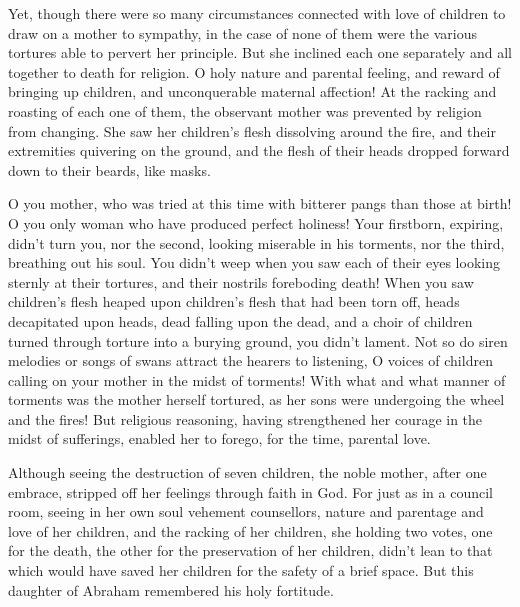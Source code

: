  Yet, though there were so many circumstances connected
with love of children to draw on a mother to sympathy, in the case of
none of them were the various tortures able to pervert her principle.
 But she inclined each one separately and all together to
death for religion.  O holy nature and parental feeling,
and reward of bringing up children, and unconquerable maternal
affection!  At the racking and roasting of each one of
them, the observant mother was prevented by religion from changing.
 She saw her children's flesh dissolving around the fire,
and their extremities quivering on the ground, and the flesh of their
heads dropped forward down to their beards, like masks.

 O you mother, who was tried at this time with bitterer
pangs than those at birth!  O you only woman who have
produced perfect holiness!  Your firstborn, expiring,
didn't turn you, nor the second, looking miserable in his torments, nor
the third, breathing out his soul.  You didn't weep when
you saw each of their eyes looking sternly at their tortures, and their
nostrils foreboding death!  When you saw children's flesh
heaped upon children's flesh that had been torn off, heads decapitated
upon heads, dead falling upon the dead, and a choir of children turned
through torture into a burying ground, you didn't lament. 
Not so do siren melodies or songs of swans attract the hearers to
listening, O voices of children calling on your mother in the midst of
torments!  With what and what manner of torments was the
mother herself tortured, as her sons were undergoing the wheel and the
fires!  But religious reasoning, having strengthened her
courage in the midst of sufferings, enabled her to forego, for the time,
parental love.

 Although seeing the destruction of seven children, the
noble mother, after one embrace, stripped off her feelings through faith
in God.  For just as in a council room, seeing in her own
soul vehement counsellors, nature and parentage and love of her
children, and the racking of her children,  she holding two
votes, one for the death, the other for the preservation of her
children,  didn't lean to that which would have saved her
children for the safety of a brief space.  But this
daughter of Abraham remembered his holy fortitude.

